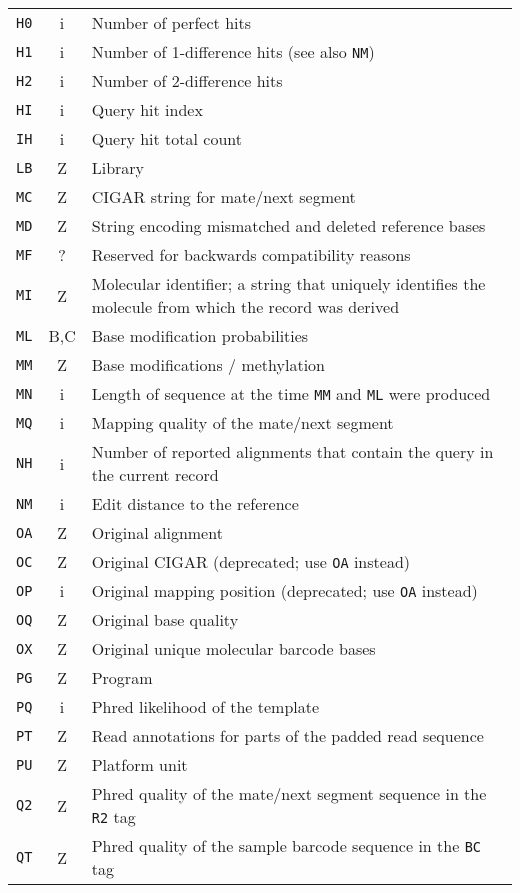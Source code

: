 \documentclass[10pt]{article}
\begin{document}
\begin{center}
\begin{longtable}{ccp{12.5cm}}
  {\tt H0} & i & Number of perfect hits \\
  {\tt H1} & i & Number of 1-difference hits (see also {\tt NM}) \\
  {\tt H2} & i & Number of 2-difference hits \\
  {\tt HI} & i & Query hit index \\
  {\tt IH} & i & Query hit total count \\
  {\tt LB} & Z & Library \\
  {\tt MC} & Z & CIGAR string for mate/next segment \\
  {\tt MD} & Z & String encoding mismatched and deleted reference bases \\
  {\tt MF} & ? & Reserved for backwards compatibility reasons \\
  {\tt MI} & Z & Molecular identifier; a string that uniquely identifies the molecule from which the record was derived \\
  {\tt ML} & B,C & Base modification probabilities \\
  {\tt MM} & Z & Base modifications / methylation  \\
  {\tt MN} & i & Length of sequence at the time {\tt MM} and {\tt ML} were produced \\
  {\tt MQ} & i & Mapping quality of the mate/next segment \\
  {\tt NH} & i & Number of reported alignments that contain the query in the current record \\
  {\tt NM} & i & Edit distance to the reference \\
  {\tt OA} & Z & Original alignment \\
  {\tt OC} & Z & Original CIGAR (deprecated; use {\tt OA} instead) \\
  {\tt OP} & i & Original mapping position (deprecated; use {\tt OA} instead) \\
  {\tt OQ} & Z & Original base quality \\
  {\tt OX} & Z & Original unique molecular barcode bases \\
  {\tt PG} & Z & Program \\
  {\tt PQ} & i & Phred likelihood of the template \\
  {\tt PT} & Z & Read annotations for parts of the padded read sequence \\
  {\tt PU} & Z & Platform unit \\
  {\tt Q2} & Z & Phred quality of the mate/next segment sequence in the {\tt R2} tag \\
  {\tt QT} & Z & Phred quality of the sample barcode sequence in the {\tt BC} tag \\

\end{longtable}
\end{center}
\end{document}
